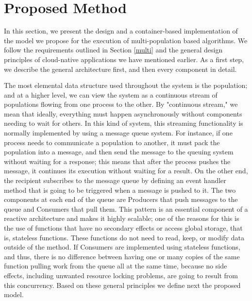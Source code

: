 \documentclass[review]{elsarticle}
\begin{document}
\section{Proposed Method} 
\label{method} 

In this section, we present the design
and a container-based implementation of the model we propose for the execution
of multi-population based algorithms. We follow the requirements outlined in
Section \ref{multi} and the general design principles of cloud-native
applications we have mentioned earlier. As a first step, we describe the general
architecture first, and then  every component in detail. 

The most elemental data structure used throughout the system is the population; and at a higher
level, we can view the system as a continuous stream of populations
flowing from one process to the other. By "continuous stream," we mean that ideally,
everything must happen asynchronously without components needing to wait for
others. In this kind of system, this streaming functionality is normally
implemented by using a message queue system. For instance, if one process needs
to communicate a population to another, it must pack the population into
a message, and then send the message 
to the queuing system without waiting for a response; this
means that after the process pushes the message, it continues its execution
without waiting for a result. On the other end, the recipient subscribes to the
message queue by defining an event handler method that is going to be triggered when a
message is pushed to it. The two components at each end of the queue are
Producers that push messages to the queue and Consumers that pull them. This
pattern is an essential component of a reactive architecture and makes
it 
highly scalable; one of the reasons for this is the use of functions
that have no secondary effects or access global storage, that is,
stateless functions. These functions do not need to read, keep, or modify data outside of the method. If
Consumers are implemented using stateless functions, and thus, there is no difference
between having one or many copies of the same function pulling work from the queue all at the
same time, because no side effects, including unwanted resource
locking problems,  are going to result from this concurrency.
Based on these general principles we define next the proposed model.
\end{document}
